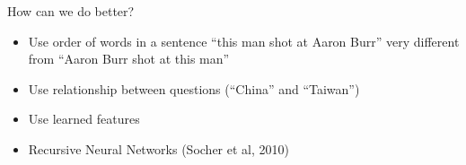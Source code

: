 \documentclass[compress]{beamer}
\begin{document}
\begin{frame}[t]
\begin{columns}
\begin{center}
		\end{center}
\end{columns}

\end{frame}

\begin{frame}{How can we do better?}

  \begin{itemize}
    \item Use order of words in a sentence ``this man shot at Aaron
      Burr'' very different from ``Aaron Burr shot at this man''
    \item Use relationship between questions (``China'' and
      ``Taiwan'')
    \item Use learned features
      \pause
    \item Recursive Neural Networks (Socher et al, 2010)
  \end{itemize}

\end{frame}
\end{document}
